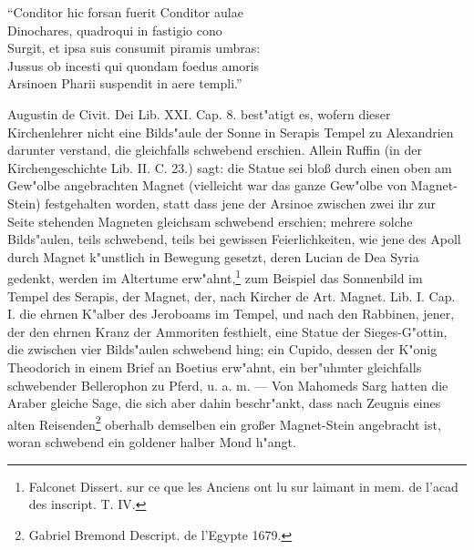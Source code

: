 \documentclass[a4paper, 11pt, oneside, polutonikogreek, german]{article}
\begin{document}
"`Conditor hic forsan fuerit Conditor aulae\\
\hspace*{0.5cm} Dinochares, quadroqui in fastigio cono\\
\hspace*{0.5cm} Surgit, et ipsa suis consumit piramis umbras:\\
\hspace*{0.5cm} Jussus ob incesti qui quondam foedus amoris\\
\hspace*{0.5cm} Arsinoen Pharii suspendit in aere templi."'

Augustin de Civit. Dei Lib. XXI. Cap. 8. best"atigt es, wofern dieser Kirchenlehrer nicht eine Bilds"aule der Sonne in Serapis Tempel zu Alexandrien darunter verstand, die gleichfalls schwebend erschien. Allein Ruffin (in der Kirchengeschichte Lib. II. C. 23.) sagt: die Statue sei bloß durch einen oben am Gew"olbe angebrachten Magnet (vielleicht war das ganze Gew"olbe von Magnet-Stein) festgehalten worden, statt dass jene der Arsinoe zwischen zwei ihr zur Seite stehenden Magneten gleichsam schwebend erschien; mehrere solche Bilds"aulen, teils schwebend, teils bei gewissen Feierlichkeiten, wie jene des Apoll durch Magnet k"unstlich in Bewegung gesetzt, deren Lucian de Dea Syria gedenkt, werden im Altertume erw"ahnt,\footnote{Falconet Dissert. sur ce que les Anciens ont lu sur laimant in mem. de l'acad des inscript. T. IV.} zum Beispiel das Sonnenbild im Tempel des Serapis, der Magnet, der, nach Kircher de Art. Magnet. Lib. I. Cap. I. die ehrnen K"alber des Jeroboams im Tempel, und nach den Rabbinen, jener, der den ehrnen Kranz der Ammoriten festhielt, eine Statue der Sieges-G"ottin, die zwischen vier Bilds"aulen schwebend hing; ein Cupido, dessen der K"onig Theodorich in einem Brief an Boetius erw"ahnt, ein ber"uhmter gleichfalls schwebender Bellerophon zu Pferd, u. a. m. --- Von Mahomeds Sarg hatten die Araber gleiche Sage, die sich aber dahin beschr"ankt, dass nach Zeugnis eines alten Reisenden\footnote{Gabriel Bremond Descript. de l'Egypte 1679.} oberhalb demselben ein großer Magnet-Stein angebracht ist, woran schwebend ein goldener halber Mond h"angt.
\end{document}
